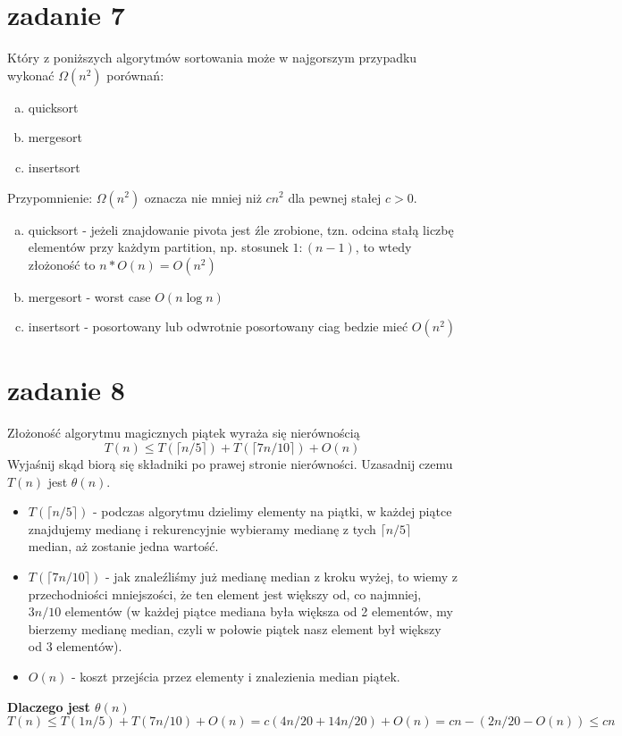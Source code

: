 \section{zadanie 7}
\begin{framed}
Który z poniższych algorytmów sortowania może w najgorszym przypadku wykonać $\Omega(n^2)$ porównań:
\begin{enumerate}[a)]
	\item quicksort
	\item mergesort
	\item insertsort
\end{enumerate}
Przypomnienie: $\Omega(n^2)$ oznacza nie mniej niż $cn^2$ dla pewnej stałej $c>0$.
\end{framed}
\begin{enumerate}[a)]
	\item quicksort - jeżeli znajdowanie pivota jest źle zrobione, tzn. odcina stałą liczbę elementów przy każdym partition, np. stosunek $1:(n-1)$, to wtedy złożoność to $n*O(n) = O(n^2)$
	\item mergesort - worst case $O(n\log n)$
	\item insertsort - posortowany lub odwrotnie posortowany ciag bedzie mieć $O(n^2)$
\end{enumerate}

\section{zadanie 8}
\begin{framed}
Złożoność algorytmu magicznych piątek wyraża się nierównością
$$ T(n) \leq T(\lceil n/5\rceil) + T(\lceil 7n/10\rceil) + O(n) $$
Wyjaśnij skąd biorą się składniki po prawej stronie nierówności. Uzasadnij czemu $T(n)$ jest $\theta(n)$.
\end{framed}
\begin{itemize}
\item $T(\lceil n/5\rceil)$ - podczas algorytmu dzielimy elementy na piątki, w każdej piątce znajdujemy medianę i rekurencyjnie wybieramy medianę z tych $\lceil n/5 \rceil$ median, aż zostanie jedna wartość.
\item $T(\lceil 7n/10\rceil)$ - jak znaleźliśmy już medianę median z kroku wyżej, to wiemy z przechodniości mniejszości, że ten element jest większy od, co najmniej, $3n/10$ elementów (w każdej piątce mediana była większa od 2 elementów, my bierzemy medianę median, czyli w połowie piątek nasz element był większy od 3 elementów).
\item $O(n)$ - koszt przejścia przez elementy i znalezienia median piątek.
\end{itemize}
\textbf{Dlaczego jest $\theta(n)$}
$$T(n) \leq T(1n/5)+T(7n/10)+O(n)= c(4n/20 + 14n/20)+O(n)= cn - (2n/20 - O(n)) \leq cn$$


